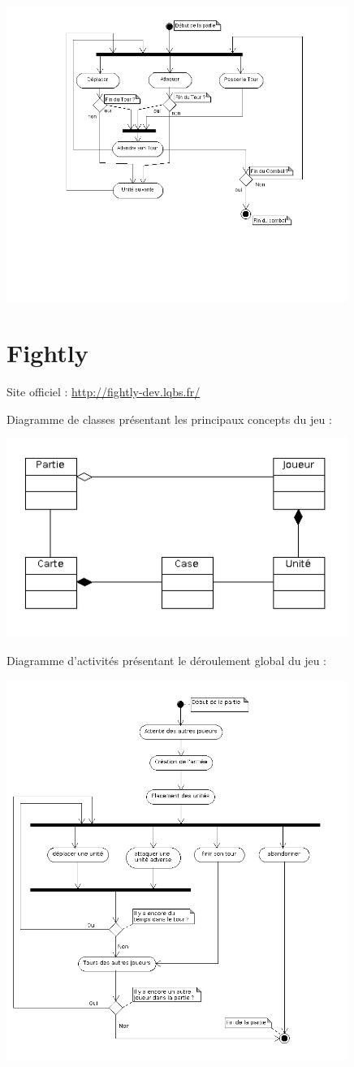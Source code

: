 \documentclass[a4paper,10pt]{report}
\begin{document}
    \includegraphics[width=420px]{diagrammes/Diagramme_Activites_BoW.png}
    

	\section{Fightly}
	
    Site officiel : \url{http://fightly-dev.lqbs.fr/}

    Diagramme de classes présentant les principaux concepts du jeu : 
    
		\includegraphics[width=420px]{diagrammes/concept-fightly.png}

    Diagramme d'activités présentant le déroulement global du jeu : 
    
    \includegraphics[width=420px]{diagrammes/fightlyactivites.png}
    
\end{document}
